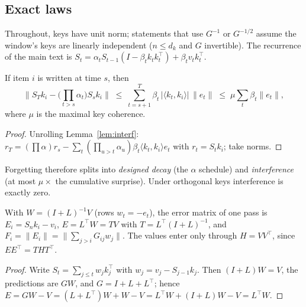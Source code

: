 \subsection{Exact laws}
Throughout, keys have unit norm; statements that use $G^{-1}$ or $G^{-1/2}$ assume the window's keys are linearly independent ($n\le d_k$ and $G$ invertible). The recurrence of the main text is $S_t=\alpha_tS_{t-1}(I-\beta_tk_tk_t^\top)+\beta_tv_tk_t^\top$.

\begin{theorem}\label{thm:retention}
If item $i$ is written at time $s$, then
\[
\Big\|S_Tk_i-\Big(\prod_{t>s}\alpha_t\Big)S_sk_i\Big\|\;\le\;\sum_{t=s+1}^{T}\beta_t\,|\langle k_t,k_i\rangle|\,\|e_t\|\;\le\;\mu\sum_t\beta_t\|e_t\|,
\]
where $\mu$ is the maximal key coherence.
\end{theorem}
\begin{proof}
Unrolling Lemma~\ref{lem:interf}: $r_T=(\prod\alpha)r_s-\sum_t(\prod_{u>t}\alpha_u)\beta_t\langle k_t,k_i\rangle e_t$ with $r_t=S_tk_i$; take norms.
\end{proof}
Forgetting therefore splits into \emph{designed decay} (the $\alpha$ schedule) and \emph{interference} (at most $\mu\times$ the cumulative surprise). Under orthogonal keys interference is exactly zero.

\begin{proposition}[Single-pass error operator, $\alpha=\beta=1$]\label{prop:errop}
With $W=(I+L)^{-1}V$ (rows $w_t=-e_t$), the error matrix of one pass is $E_i=S_nk_i-v_i$, $E=L^\top W=TV$ with $T=L^\top(I+L)^{-1}$, and $F_i=\|E_i\|=\|\sum_{j>i}G_{ij}w_j\|$. The values enter only through $H=VV^\top$, since $EE^\top=THT^\top$.
\end{proposition}
\begin{proof}
Write $S_t=\sum_{j\le t}w_jk_j^\top$ with $w_j=v_j-S_{j-1}k_j$. Then $(I+L)W=V$, the predictions are $GW$, and $G=I+L+L^\top$; hence $E=GW-V=(L+L^\top)W+W-V=L^\top W+(I+L)W-V=L^\top W$.
\end{proof}

